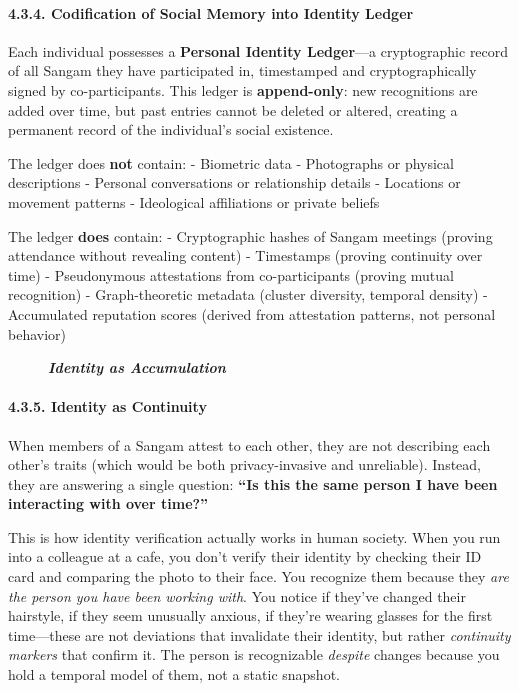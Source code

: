 \paragraph{4.3.4. Codification of Social Memory into Identity
Ledger}\label{codification-of-social-memory-into-identity-ledger}

Each individual possesses a \textbf{Personal Identity Ledger}---a
cryptographic record of all Sangam they have participated in,
timestamped and cryptographically signed by co-participants. This ledger
is \textbf{append-only}: new recognitions are added over time, but past
entries cannot be deleted or altered, creating a permanent record of the
individual's social existence.

The ledger does \textbf{not} contain: - Biometric data - Photographs or
physical descriptions - Personal conversations or relationship details -
Locations or movement patterns - Ideological affiliations or private
beliefs

The ledger \textbf{does} contain: - Cryptographic hashes of Sangam
meetings (proving attendance without revealing content) - Timestamps
(proving continuity over time) - Pseudonymous attestations from
co-participants (proving mutual recognition) - Graph-theoretic metadata
(cluster diversity, temporal density) - Accumulated reputation scores
(derived from attestation patterns, not personal behavior)

\begin{figure}
\centering
\pandocbounded{}
\caption{\textbf{\emph{Identity as Accumulation}}}
\end{figure}

\paragraph{4.3.5. Identity as Continuity}\label{identity-as-continuity}

When members of a Sangam attest to each other, they are not describing
each other's traits (which would be both privacy-invasive and
unreliable). Instead, they are answering a single question: \textbf{``Is
this the same person I have been interacting with over time?''}

This is how identity verification actually works in human society. When
you run into a colleague at a cafe, you don't verify their identity by
checking their ID card and comparing the photo to their face. You
recognize them because they \emph{are the person you have been working
with}. You notice if they've changed their hairstyle, if they seem
unusually anxious, if they're wearing glasses for the first time---these
are not deviations that invalidate their identity, but rather
\emph{continuity markers} that confirm it. The person is recognizable
\emph{despite} changes because you hold a temporal model of them, not a
static snapshot.

